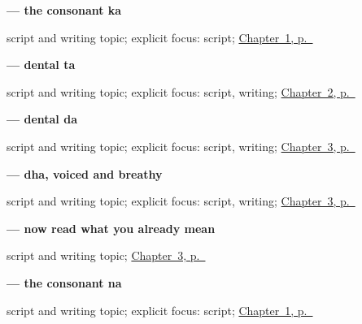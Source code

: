 \noindent\begin{minipage}[t]{\linewidth}
\raggedright
\textbf{ — the consonant ka}\par
\footnotesize script and writing topic; explicit focus: script; \hyperref[ch:first-greeting-script]{Chapter~1, p.~\pageref*{ch:first-greeting-script}}
\end{minipage}\par\smallskip

\noindent\begin{minipage}[t]{\linewidth}
\raggedright
\textbf{ — dental ta}\par
\footnotesize script and writing topic; explicit focus: script, writing; \hyperref[ch:thanks-script-a]{Chapter~2, p.~\pageref*{ch:thanks-script-a}}
\end{minipage}\par\smallskip

\noindent\begin{minipage}[t]{\linewidth}
\raggedright
\textbf{ — dental da}\par
\footnotesize script and writing topic; explicit focus: script, writing; \hyperref[ch:thanks-script-b]{Chapter~3, p.~\pageref*{ch:thanks-script-b}}
\end{minipage}\par\smallskip

\noindent\begin{minipage}[t]{\linewidth}
\raggedright
\textbf{ — dha, voiced and breathy}\par
\footnotesize script and writing topic; explicit focus: script, writing; \hyperref[ch:thanks-script-b]{Chapter~3, p.~\pageref*{ch:thanks-script-b}}
\end{minipage}\par\smallskip

\noindent\begin{minipage}[t]{\linewidth}
\raggedright
\textbf{ — now read what you already mean}\par
\footnotesize script and writing topic; \hyperref[ch:thanks-script-b]{Chapter~3, p.~\pageref*{ch:thanks-script-b}}
\end{minipage}\par\smallskip

\noindent\begin{minipage}[t]{\linewidth}
\raggedright
\textbf{ — the consonant na}\par
\footnotesize script and writing topic; explicit focus: script; \hyperref[ch:first-greeting-script]{Chapter~1, p.~\pageref*{ch:first-greeting-script}}
\end{minipage}\par\smallskip

